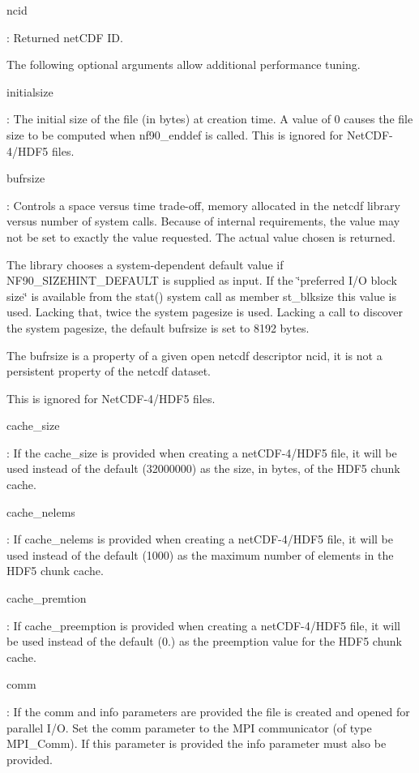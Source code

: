 {\ttfamily ncid}

\+: Returned net\+C\+DF ID.

The following optional arguments allow additional performance tuning.

{\ttfamily initialsize}

\+: The initial size of the file (in bytes) at creation time. A value of 0 causes the file size to be computed when nf90\+\_\+enddef is called. This is ignored for Net\+C\+D\+F-\/4/\+H\+D\+F5 files.

{\ttfamily bufrsize}

\+: Controls a space versus time trade-\/off, memory allocated in the netcdf library versus number of system calls. Because of internal requirements, the value may not be set to exactly the value requested. The actual value chosen is returned.

The library chooses a system-\/dependent default value if N\+F90\+\_\+\+S\+I\+Z\+E\+H\+I\+N\+T\+\_\+\+D\+E\+F\+A\+U\+LT is supplied as input. If the \char`\"{}preferred I/\+O
    block size\char`\"{} is available from the stat() system call as member st\+\_\+blksize this value is used. Lacking that, twice the system pagesize is used. Lacking a call to discover the system pagesize, the default bufrsize is set to 8192 bytes.

The bufrsize is a property of a given open netcdf descriptor ncid, it is not a persistent property of the netcdf dataset.

This is ignored for Net\+C\+D\+F-\/4/\+H\+D\+F5 files.

{\ttfamily cache\+\_\+size}

\+: If the cache\+\_\+size is provided when creating a net\+C\+D\+F-\/4/\+H\+D\+F5 file, it will be used instead of the default (32000000) as the size, in bytes, of the H\+D\+F5 chunk cache.

{\ttfamily cache\+\_\+nelems}

\+: If cache\+\_\+nelems is provided when creating a net\+C\+D\+F-\/4/\+H\+D\+F5 file, it will be used instead of the default (1000) as the maximum number of elements in the H\+D\+F5 chunk cache.

{\ttfamily cache\+\_\+premtion}

\+: If cache\+\_\+preemption is provided when creating a net\+C\+D\+F-\/4/\+H\+D\+F5 file, it will be used instead of the default (0.) as the preemption value for the H\+D\+F5 chunk cache.

{\ttfamily comm}

\+: If the comm and info parameters are provided the file is created and opened for parallel I/O. Set the comm parameter to the M\+PI communicator (of type M\+P\+I\+\_\+\+Comm). If this parameter is provided the info parameter must also be provided.

